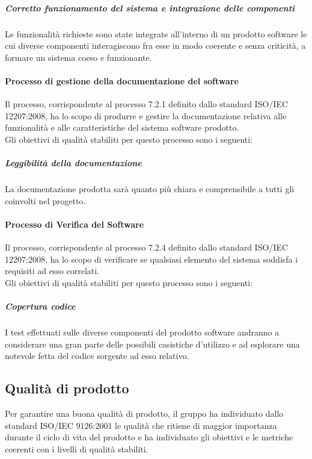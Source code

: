 				\subparagraph{Corretto funzionamento del sistema e integrazione delle componenti}
				Le funzionalità richieste sono state integrate all'interno di un prodotto software le cui diverse componenti interagiscono fra esse in modo coerente e senza criticità, a formare un sistema coeso e funzionante.
			
			\paragraph{Processo di gestione della documentazione del software}
			Il processo, corrispondente al processo 7.2.1 definito dallo standard ISO/IEC 12207:2008, ha lo scopo di produrre e gestire la documentazione relativa alle funzionalità e alle caratteristiche del sistema software prodotto.
			\\Gli obiettivi di qualità stabiliti per questo processo sono i seguenti:

				\subparagraph{Leggibilità della documentazione}
				La documentazione prodotta sarà quanto più chiara e comprensibile a tutti gli  coinvolti nel progetto.
			
			\paragraph{Processo di Verifica del Software}
			Il processo, corrispondente al processo 7.2.4 definito dallo standard ISO/IEC 12207:2008, ha lo scopo di verificare se qualsiasi elemento del sistema soddisfa i requisiti ad esso correlati.
			\\Gli obiettivi di qualità stabiliti per questo processo sono i seguenti:

				\subparagraph{Copertura codice}
				I test effettuati sulle diverse componenti del prodotto software andranno a considerare una gran parte delle possibili casistiche d'utilizzo e ad esplorare una notevole fetta del codice sorgente ad esso relativo.
	
	\subsection{Qualità di prodotto}
	Per garantire una buona qualità di prodotto, il gruppo \hx{} ha individuato dallo standard ISO/IEC 9126:2001 le qualità che ritiene di maggior importanza durante il ciclo di vita del prodotto e ha individuato gli obiettivi e le metriche coerenti con i livelli di qualità stabiliti.
